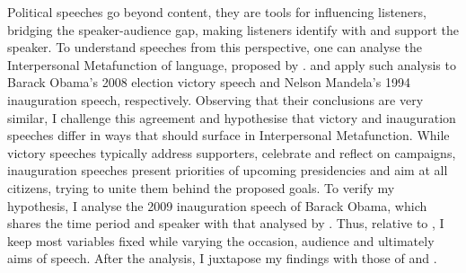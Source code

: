 \documentclass[11pt]{article}
\begin{document}
{	%
	Political speeches go beyond content, they are tools for influencing listeners, 
	bridging the speaker-audience gap, making listeners identify with and support the speaker. 
	To understand speeches from this perspective, one can analyse the Interpersonal Metafunction of language, proposed by \citet{Halliday1970IM}.
	\citet{Ye} and \citet{Nur} apply such analysis to Barack Obama's 2008 election victory speech and Nelson Mandela's 1994 inauguration speech, respectively.
	Observing that their conclusions are very similar, 
	I challenge this agreement and hypothesise that victory and inauguration speeches differ in ways that should surface in Interpersonal Metafunction.
	While victory speeches typically address supporters, celebrate and reflect on campaigns, inauguration speeches present priorities of upcoming presidencies and aim at all citizens, trying to unite them behind the proposed goals.
	To verify my hypothesis, I analyse the 2009 inauguration speech of Barack Obama, which shares the time period and speaker with that analysed by  \citeauthor{Ye}. 
	Thus, relative to \citeauthor{Ye}, I keep most variables fixed while varying the occasion, audience and ultimately aims of speech. 
	After the analysis, I juxtapose my findings with those of \citeauthor{Ye} and \citeauthor{Nur}.
}

\end{document}
